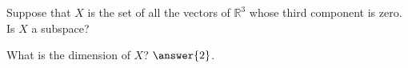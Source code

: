 \documentclass{ximera}
\begin{document}

\begin{exercise}
    Suppose that $X$ is the set of all the vectors of ${\mathbb{R}}^3$ whose third component is zero.  Is $X$ a subspace?  %
    \begin{multipleChoice}
    \end{multipleChoice}
    \begin{problem}
        What is the dimension of $X$? $\answer{2}$.
    \end{problem}
\end{exercise}
\end{document}
